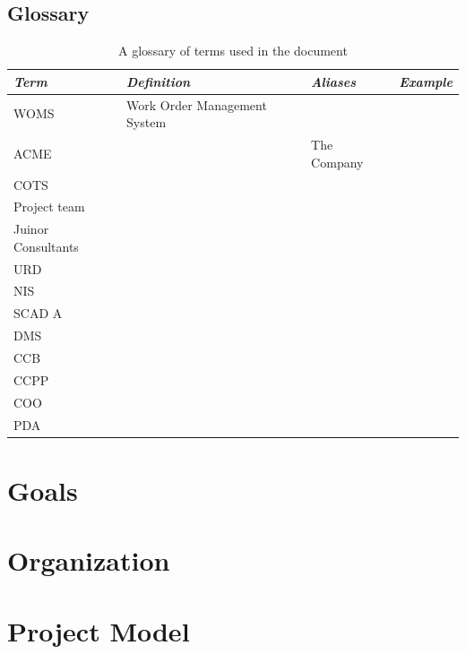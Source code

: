 \documentclass[a4paper]{article}
\begin{document}
\subsection{Glossary}
\label{sub:glossary}

\begin{table}[!ht]
	\centering
	\begin{tabular}{|p{2cm}| p{3cm} |l| p{3cm} |}
	\hline
		\textit{Term} & \textit{Definition} & \textit{Aliases} & \textit{Example} \\
	\hline
		
		WOMS	 & Work Order Management System & & \\
		ACME	 & & The Company & \\	
		COTS	 & & & \\		
		Project team & & & \\			
		Juinor Consultants	& & & \\		
		URD & & & \\
		NIS	& & & \\		
		SCAD	A & & & \\ 			
		DMS & & & \\
		CCB	& & & \\
		CCPP	 & & & \\
		COO	& & & \\
		PDA	& & & \\

	\hline
	
	\end{tabular}
	\caption{A glossary of terms used in the document}
\end{table}

\section{Goals} 
\label{sec:goals}


\section{Organization}
\label{sec:organization}


\section{Project Model} 
\label{sec:project_model}
\end{document}

